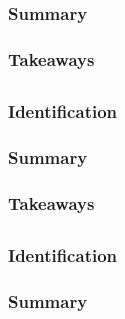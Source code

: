 \documentclass[
	letterpaper, %
]{jdf}
\begin{document}
\subsubsection{Summary}

\subsubsection{Takeaways}


\subsection{}
\subsubsection{Identification}

\subsubsection{Summary}

\subsubsection{Takeaways}

\subsection{}
\subsubsection{Identification}

\subsubsection{Summary}
\end{document}
